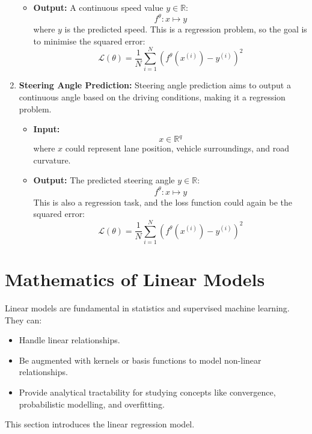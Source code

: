 \begin{enumerate}
\begin{itemize}[noitemsep]
              \item \textbf{Output:} 
              A continuous speed value \( y \in \mathbb{R} \):
              \begin{equation}
                  f^\theta : x \mapsto y
              \end{equation}
              where \( y \) is the predicted speed. This is a regression problem, so the goal is to minimise the squared error:
              \begin{equation}
                  \mathcal{L}(\theta) = \frac{1}{N} \sum_{i=1}^{N} (f^\theta(x^{(i)}) - y^{(i)})^2
              \end{equation}
          \end{itemize}

    \item \textbf{Steering Angle Prediction:}
          Steering angle prediction aims to output a continuous angle based on the driving conditions, making it a regression problem.
          \begin{itemize}[noitemsep]
              \item \textbf{Input:}
              \begin{equation}
                  x \in \mathbb{R}^q
              \end{equation}
              where \( x \) could represent lane position, vehicle surroundings, and road curvature.
              
              \item \textbf{Output:} 
              The predicted steering angle \( y \in \mathbb{R} \):
              \begin{equation}
                  f^\theta : x \mapsto y
              \end{equation}
              This is also a regression task, and the loss function could again be the squared error:
              \begin{equation}
                  \mathcal{L}(\theta) = \frac{1}{N} \sum_{i=1}^{N} (f^\theta(x^{(i)}) - y^{(i)})^2
              \end{equation}
          \end{itemize}
\end{enumerate}

\section{Mathematics of Linear Models}

Linear models are fundamental in statistics and supervised machine learning. They can:
\begin{itemize}[noitemsep]
    \item Handle linear relationships.
    \item Be augmented with kernels or basis functions to model non-linear relationships.
    \item Provide analytical tractability for studying concepts like convergence, probabilistic modelling, and overfitting.
\end{itemize}
This section introduces the linear regression model.

